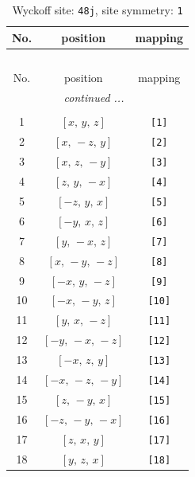 \documentclass[fleqn,8pt]{jsarticle}
\begin{document}
\begin{longtable}{ccc}
\caption{Wyckoff site: {\tt 48j}, site symmetry: {\tt 1}}
 \\
 \hline \hline
No. & position & mapping \\ \hline \endfirsthead

\multicolumn{2}{l}{\tablename\ \thetable{}} \\
 \hline \hline
No. & position & mapping \\ \hline \endhead

 \hline \hline
\multicolumn{2}{r}{\footnotesize\it continued ...} \\ \endfoot

 \hline \hline
\multicolumn{2}{r}{} \\ \endlastfoot

1 & $\left[ x,\, y,\, z \right]$ & {\tt [1]} \\ \hline
2 & $\left[ x,\, - z,\, y \right]$ & {\tt [2]} \\ \hline
3 & $\left[ x,\, z,\, - y \right]$ & {\tt [3]} \\ \hline
4 & $\left[ z,\, y,\, - x \right]$ & {\tt [4]} \\ \hline
5 & $\left[ - z,\, y,\, x \right]$ & {\tt [5]} \\ \hline
6 & $\left[ - y,\, x,\, z \right]$ & {\tt [6]} \\ \hline
7 & $\left[ y,\, - x,\, z \right]$ & {\tt [7]} \\ \hline
8 & $\left[ x,\, - y,\, - z \right]$ & {\tt [8]} \\ \hline
9 & $\left[ - x,\, y,\, - z \right]$ & {\tt [9]} \\ \hline
10 & $\left[ - x,\, - y,\, z \right]$ & {\tt [10]} \\ \hline
11 & $\left[ y,\, x,\, - z \right]$ & {\tt [11]} \\ \hline
12 & $\left[ - y,\, - x,\, - z \right]$ & {\tt [12]} \\ \hline
13 & $\left[ - x,\, z,\, y \right]$ & {\tt [13]} \\ \hline
14 & $\left[ - x,\, - z,\, - y \right]$ & {\tt [14]} \\ \hline
15 & $\left[ z,\, - y,\, x \right]$ & {\tt [15]} \\ \hline
16 & $\left[ - z,\, - y,\, - x \right]$ & {\tt [16]} \\ \hline
17 & $\left[ z,\, x,\, y \right]$ & {\tt [17]} \\ \hline
18 & $\left[ y,\, z,\, x \right]$ & {\tt [18]} \\ \hline

\end{longtable}
\end{document}
